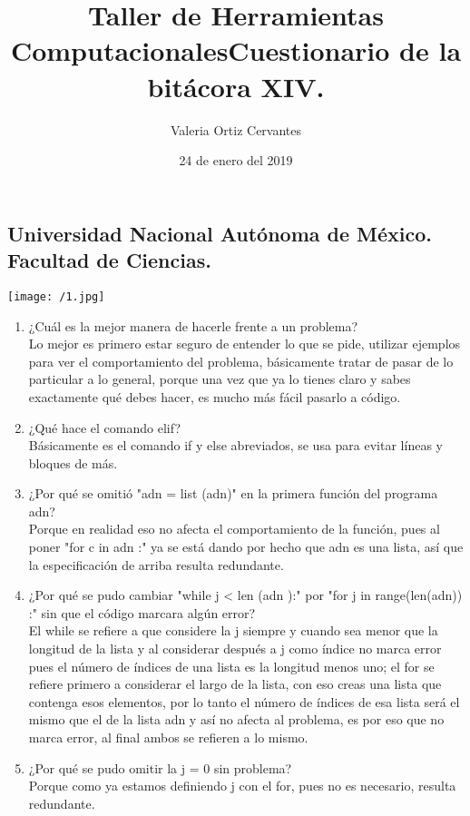 \documentclass{article} %
\title{\Huge Taller de Herramientas Computacionales}
\author{\huge Valeria Ortiz Cervantes}
\date{\LARGE 24 de enero del 2019}
\begin{document}
\maketitle
\begin{center}
	\subsection*{\LARGE Universidad Nacional Autónoma de México.\\Facultad de Ciencias.\\}
	\texttt{[image: /1.jpg]}
\end{center}
\newpage
\title{\LARGE Cuestionario de la bitácora XIV.}
\begin{enumerate}
	\item ¿Cuál es la mejor manera de hacerle frente a un problema?\\Lo mejor es primero estar seguro de entender lo que se pide, utilizar ejemplos para ver el comportamiento del problema, básicamente tratar de pasar de lo particular a lo general, porque una vez que ya lo tienes claro y sabes exactamente qué debes hacer, es mucho más fácil pasarlo a código.
	\item ¿Qué hace el comando elif?\\Básicamente es el comando if y else abreviados, se usa para evitar líneas y bloques de más.
	\item ¿Por qué se omitió "adn = list (adn)" en la primera función del programa adn?\\Porque en realidad eso no afecta el comportamiento de la función, pues al poner "for c in adn :" ya se está dando por hecho que adn es una lista, así que la especificación de arriba resulta redundante.
	\item ¿Por qué se pudo cambiar "while j < len (adn ):" por "for j in range(len(adn)) :" sin que el código marcara algún error?\\El while se refiere a que considere la j siempre y cuando sea menor que la longitud de la lista y al considerar después a j como índice no marca error pues el número de índices de una lista es la longitud menos uno; el for se refiere primero a considerar el largo de la lista, con eso creas una lista que contenga esos elementos, por lo tanto el número de índices de esa lista será el mismo que el de la lista adn y así no afecta al problema, es por eso que no marca error, al final ambos se refieren a lo mismo. 
	\item ¿Por qué se pudo omitir la j = 0 sin problema?\\Porque como ya estamos definiendo j con el for, pues no es necesario, resulta redundante. 
\end{enumerate}
\end{document}
